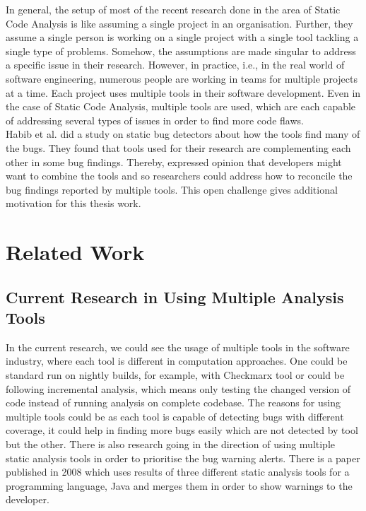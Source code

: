 In general, the setup of most of the recent research \cite{CB16} \cite{JSMB13} done in the area of Static Code Analysis is like assuming a single project in an organisation. Further, they assume a single person is working on a single project with a single tool tackling a single type of problems. Somehow, the assumptions are made singular to address a specific issue in their research. However, in practice, i.e., in the real world of software engineering, numerous people are working in teams for multiple projects at a time. Each project uses multiple tools in their software development. Even in the case of Static Code Analysis, multiple tools are used, which are each capable of addressing several types of issues in order to find more code flaws. \cite{SCALe} \\

Habib et al. \cite{habib} did a study on static bug detectors about how the tools find many of the bugs. They found that tools used for their research are complementing each other in some bug findings.  Thereby, expressed opinion that developers might want to combine the tools and so researchers could address how to reconcile the bug findings reported by multiple tools. This open challenge gives additional motivation for this thesis work.

\section{Related Work}
\label{ch:relatedwork_report}

\subsection{Current Research in Using Multiple Analysis Tools}

In the current research, we could see the usage of multiple tools in the software industry, where each tool is different in computation approaches. One could be standard run on nightly builds, for example, with Checkmarx \cite{checkmarx} tool or could be following incremental analysis, which means only testing the changed version of code instead of running analysis on complete codebase. The reasons for using multiple tools could be as each tool is capable of detecting bugs with different coverage, \cite{bessey2010few} \cite{delaitre2015evaluating} it could help in finding more bugs easily which are not detected by tool but the other. \cite{SCALe} There is also research \cite{flynn2018prioritizing} going in the direction of using multiple static analysis tools in order to prioritise the bug warning alerts. There is a paper \cite{meng2008approach} published in 2008 which uses results of three different static analysis tools for a programming language, Java and merges them in order to show warnings to the developer. \\ \\

